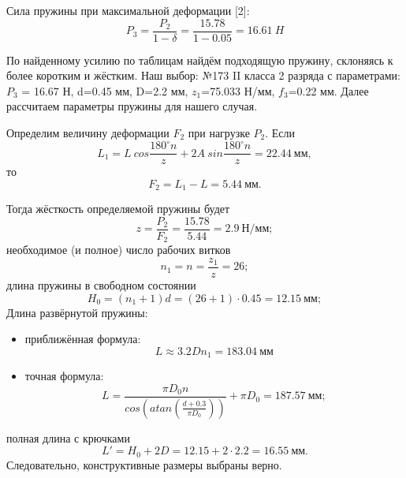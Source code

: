 \documentclass[14pt,a4paper,russian]{scrartcl}
\begin{document}
        Сила пружины при максимальной деформации [2]:
        \[ P_3 = \frac{P_2}{1-\delta} = \frac{15.78}{1-0.05} = 16.61\ H\]

        По найденному усилию по таблицам найдём подходящую пружину, склоняясь к более коротким
        и жёстким. Наш выбор: №173 II класса 2 разряда с параметрами: \( P_3 \) = 16.67 Н, d=0.45 мм, 
        D=2.2 мм, \( z_1 \)=75.033 Н/мм, \( f_3 \)=0.22 мм. Далее рассчитаем параметры
        пружины для нашего случая.

        Определим величину деформации \( F_2 \) при нагрузке \( P_2 \). Если 
        \[ L_1 =  L\ cos\frac{180^\circ n}{z} + 2A\ sin\frac{180^\circ n}{z} = 22.44\ \text{мм},\]
        то 
        \[ F_2 = L_1 - L = 5.44\ \text{мм}.\]

        Тогда жёсткость определяемой пружины будет
        \[ z = \frac{P_2}{F_2} = \frac{15.78}{5.44} = 2.9\ \text{Н/мм}; \]
        необходимое (и полное) число рабочих витков
        \[ n_1 = n = \frac{z_1}{z} = 26;\]
        длина пружины в свободном состоянии
        \[ H_0 = (n_1 + 1)d = (26 + 1)\cdot 0.45= 12.15\ \text{мм}; \]
        Длина развёрнутой пружины:
        \begin{itemize}
            \item приближённая формула:
                \[ L\approx 3.2Dn_1 = 183.04\ \text{мм} \]
            \item точная формула:
                \[ L = \frac{\pi D_0 n}{cos(atan(\frac{d+0.3}{\pi D_0 }))} + \pi D_0 = 187.57\ \text{мм};\]
        \end{itemize}
        
        полная длина с крючками
        \[ L' = H_0 + 2D = 12.15 + 2\cdot 2.2 = 16.55\ \text{мм}. \]
        Следовательно, конструктивные размеры выбраны верно.
\end{document}

